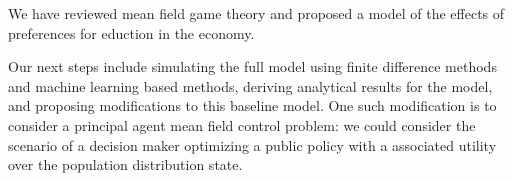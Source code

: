 We have reviewed mean field game theory and proposed a model of the effects of preferences for eduction in the economy.

Our next steps include simulating the full model using finite difference methods and machine learning based methods, deriving analytical results for the model, and proposing modifications to this baseline model. One such modification is to consider a principal agent mean field control problem: we could consider the scenario of a decision maker optimizing a public policy with a associated utility over the population distribution state.